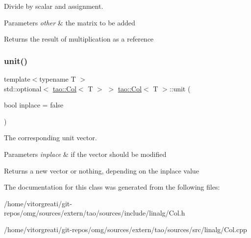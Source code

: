 Divide by scalar and assignment. 


\begin{DoxyParams}{Parameters}
{\em other} & the matrix to be added \\
\hline
\end{DoxyParams}
\begin{DoxyReturn}{Returns}
the result of multiplication as a reference 
\end{DoxyReturn}
\mbox{\label{classtao_1_1_col_ae913e98d4ed12cc7ee1975b2aff07c05}} 
\subsubsection{\texorpdfstring{unit()}{unit()}}
{\footnotesize\ttfamily template$<$typename T $>$ \\
std\+::optional$<$ \mbox{\hyperlink{classtao_1_1_col}{tao\+::\+Col}}$<$ T $>$ $>$ \mbox{\hyperlink{classtao_1_1_col}{tao\+::\+Col}}$<$ T $>$\+::unit (\begin{DoxyParamCaption}\item[{bool}]{inplace = {\ttfamily false} }\end{DoxyParamCaption})}



The corresponding unit vector. 


\begin{DoxyParams}{Parameters}
{\em inplace} & if the vector should be modified \\
\hline
\end{DoxyParams}
\begin{DoxyReturn}{Returns}
a new vector or nothing, depending on the inplace value 
\end{DoxyReturn}


The documentation for this class was generated from the following files\+:\begin{DoxyCompactItemize}
\item 
/home/vitorgreati/git-\/repos/omg/sources/extern/tao/sources/include/linalg/Col.\+h\item 
/home/vitorgreati/git-\/repos/omg/sources/extern/tao/sources/src/linalg/Col.\+cpp\end{DoxyCompactItemize}

